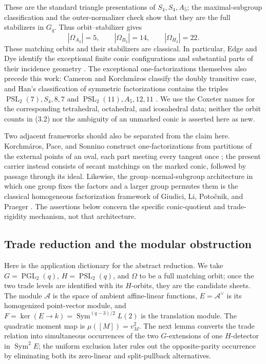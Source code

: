 \documentclass[11pt]{article}
\theoremstyle{definition}
\theoremstyle{remark}
\begin{document}
These are the standard triangle presentations of \(S_4,S_4,A_5\);
the maximal-subgroup classification and the outer-normalizer check
\cite{Giudici2007} show that they are the full stabilizers in \(G_q\).
Thus orbit--stabilizer gives
\[
 |\Omega_{A_3}|=5,\qquad |\Omega_{B_3}|=14,\qquad
 |\Omega_{H_3}|=22.                                      \tag{3.2}
\]
These matching orbits and their stabilizers are classical.  In particular,
Edge and Dye identify the exceptional finite conic configurations and
substantial parts of their incidence geometry
\cite{Edge1956,Dye1991}.  The exceptional one-factorizations themselves
also precede this work: Cameron and Korchm\'aros classify the doubly
transitive case, and Han's classification of symmetric factorizations
contains the triples \(\operatorname{PSL}_2(7),S_4,8,7\) and
\(\operatorname{PSL}_2(11),A_5,12,11\)
\cite{CameronKorchmaros1993,Han2025}.  We use the Coxeter names for the
corresponding tetrahedral, octahedral, and icosahedral data; neither the
orbit counts in (3.2) nor the ambiguity of an unmarked conic is asserted
here as new.

Two adjacent frameworks should also be separated from the claim here.
Korchm\'aros, Pace, and Sonnino construct one-factorizations from partitions
of the external points of an oval, each part meeting every tangent once
\cite{KorchmarosPaceSonnino2018}; the present carrier instead consists of
secant matchings on the marked conic, followed by passage through its ideal.
Likewise, the group--normal-subgroup architecture in which one group fixes
the factors and a larger group permutes them is the classical homogeneous
factorization framework of Giudici, Li, Poto\v{c}nik, and Praeger
\cite{GiudiciLiPotocnikPraeger2006}.  The assertions below concern the
specific conic-quotient and trade-rigidity mechanism, not that architecture.

\subsection{Trade reduction and the modular obstruction}

Here is the application dictionary for the abstract reduction.  We take
\(G=\operatorname{PGL}_2(q)\), \(H=\operatorname{PSL}_2(q)\), and
\(\Omega\) to be a full matching orbit; once the two trade levels are
identified with its \(H\)-orbits, they are the candidate sheets.  The module
\(\mathcal A\) is the space of ambient affine-linear functions,
\(E=\mathcal A^\vee\) is its homogenized point-vector module, and
\(F=\ker(E\to k)=\operatorname{Sym}^{(q-3)/2}L(2)\) is the translation
module.  The quadratic moment map is
\(\mu([M])=v_M^2\).  The next lemma converts the
trade relation into simultaneous occurrences of the two \(G\)-extensions of
one \(H\)-detector in \(\operatorname{Sym}^2E\); the uniform exclusion later
rules out the opposite-parity occurrence by eliminating both its zero-linear
and split-pullback alternatives.
\end{document}
